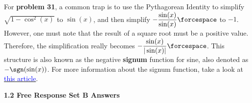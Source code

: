 \begin{tcolorbox}[interesting]
    For \textbf{problem 31}, a common trap is to use the Pythagorean Identity to simplify $\sqrt{1 - \cos^2 (x)}$ to $\sin (x)$, and then simplify $-\dfrac{\sin (x)}{\sin (x)} \forcespace$ to $-1$. However, one must note that the result of a square root must be a positive value. Therefore, the simplification really becomes $-\dfrac{\sin (x)}{|\sin (x)|} \forcespace$. This structure is also known as the negative \textbf{signum} function for sine, also denoted as $-\sgn(\sin (x))$. For more information about the signum function, take a look at \href{https://en.wikipedia.org/wiki/Sign_function}{\textcolor{blue}{this article}}.
\end{tcolorbox} \vspace{11pt}

\textbf{\large{1.2 Free Response Set B Answers}} \par

 \\[11pt]
 \\[11pt]
 \\[11pt]
 \\[11pt]
 \\[11pt]